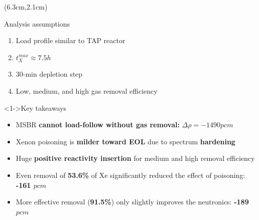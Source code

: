 \begin{frame}
\begin{columns}
	\column[t]{5.5cm}
	\begin{textblock*}{6.1cm}(6.3cm,2.1cm) %
	\begin{block}{Analysis assumptions}
				\fontsize{7}{9}\selectfont
		\begin{enumerate}             
			\item Load profile similar to TAP reactor
			\item $t^{max}_X\approx7.5h$
			\item 30-min depletion step
			\item Low, medium, and high gas removal efficiency
		\end{enumerate}
		\vspace{-4mm}
	\end{block}

	\begin{block}<1->{Key takeaways}
				\fontsize{7}{9}\selectfont
		\begin{itemize}
			\item<1-> MSBR \textbf{cannot load-follow without gas removal:} 
			$\Delta\rho=-1490pcm$
			\item<2-> Xenon poisoning is \textbf{milder toward EOL} due to 
			spectrum \textbf{hardening}
			\item<3-> Huge \textbf{positive reactivity insertion} for medium 
			and high removal efficiency
			\item<4-> Even removal of \textbf{53.6\%} of Xe significantly 
			reduced the effect of poisoning: \textbf{-161 $pcm$}
			\item<5-> More effective removal (\textbf{91.5\%}) only 
			slightly improves the neutronics: \textbf{-189 $pcm$}
		\end{itemize}
		
	\end{block}
\end{textblock*}
\end{columns}
\end{frame}

